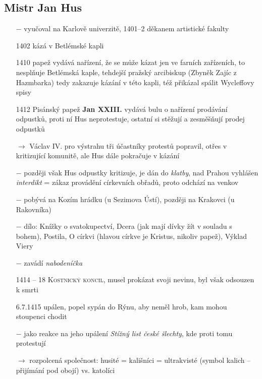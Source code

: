 \documentclass{article}
\begin{document}
\subsection*{Mistr Jan Hus}
\begin{itemize}
    \vspace{-0.5em}
    \setlength\itemsep{0.15em}
    \item[$-$] vyučoval na Karlově univerzitě, 1401--2 děkanem artistické fakulty
    \item[1402] kázá v Betlémské kapli
    \item[1410] papež vydává nařízení, že se může kázat jen ve farních zařízeních, to nesplňuje Betlémská kaple, tehdejší pražský arcibiskup (Zbyněk Zajíc z Hazmbarka) tedy zakazuje kázání v této kapli, též přikázal spálit Wycleffovy spisy
    \item[1412] Pisánský papež \textbf{Jan XXIII.} vydává bulu o nařízení prodávání odpustků, proti ní Hus neprotestuje, ostatní si stěžují a zesměšňují prodej odpustků
    \item[$\rightarrow$] Václav IV. pro výstrahu tři účastníky protestů popravil, otřes v kritizující komunitě, ale Hus dále pokračuje v kázání
    \item[$-$] později však Hus odpustky kritizuje, je dán do \textit{klatby}, nad Prahou vyhlášen \textit{interdikt} = zákaz provádění církevních obřadů, proto odchází na venkov
    \item[$-$] pobývá na Kozím hrádku (u Sezimova Ústí), později na Krakovci (u Rakovníka)
    \item[$-$] dílo: Knížky o svatokupectví, Dcera (jak mají dívky žít v souladu s bohem), Postila, O církvi (hlavou církve je Kristus, nikoliv papež), Výklad Viery
    \item[$-$] zavádí \textit{nabodeníčka}
    \item[1414 -- 18] \textsc{Kostnický koncil}, musel prokázat svoji nevinu, byl však odsouzen k smrti
    \item[6.7.1415] upálen, popel sypán do Rýnu, aby neměl hrob, kam mohou stoupenci chodit
    \item[$-$] jako reakce na jeho upálení \textit{Stížný list české šlechty}, kde proti tomu protestují
    \item[$\rightarrow$] rozpolcená společnost: husité = kališníci = ultrakvisté (symbol kalich -- přijímání pod obojí) vs. katolíci
\end{itemize}
\end{document}
